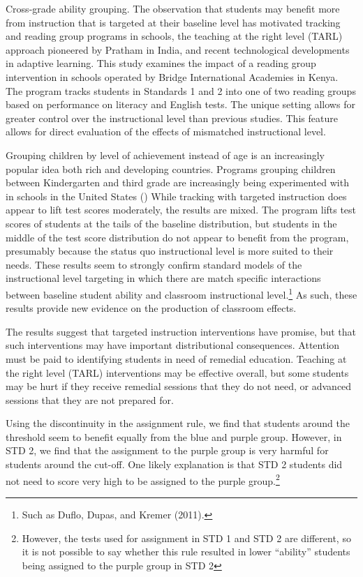 \documentclass[10pt]{article}
\begin{document}
Cross-grade ability grouping. The observation that students may benefit more from instruction that is targeted at their baseline level has motivated tracking and reading group programs in schools, the teaching at the right level (TARL) approach pioneered by Pratham in India, and recent technological developments in adaptive learning. This study examines the impact of a reading group intervention in schools operated by Bridge International Academies in Kenya. The program tracks students in Standards 1 and 2 into one of two reading groups based on performance on literacy and English tests. The unique setting allows for greater control over the instructional level than previous studies. This feature allows for direct evaluation of the effects of mismatched instructional level. 

Grouping children by level of achievement instead of age is an increasingly popular idea both rich and developing countries. Programs grouping children between Kindergarten and third grade are increasingly being experimented with in schools in the United States (\cite{edweek20191106})
While tracking with targeted instruction does appear to lift test scores moderately, the results are mixed. The program lifts test scores of students at the tails of the baseline distribution, but students in the middle of the test score distribution do not appear to benefit from the program, presumably because the status quo instructional level is more suited to their needs. These results seem to strongly confirm standard models of the instructional level targeting in which there are match specific interactions between baseline student ability and classroom instructional level.\footnote{Such as Duflo, Dupas, and Kremer (2011).} As such, these results provide new evidence on the production of classroom effects.

The results suggest that targeted instruction interventions have promise, but that such interventions may have important distributional consequences. Attention must be paid to identifying students in need of remedial education. Teaching at the right level (TARL) interventions may be effective overall, but some students may be hurt if they receive remedial sessions that they do not need, or advanced sessions that they are not prepared for.

Using the discontinuity in the assignment rule, we find that students around the threshold seem to benefit equally from the blue and purple group. However, in STD 2, we find that the assignment to the purple group is very harmful for students around the cut-off. One likely explanation is that STD 2 students did not need to score very high to be assigned to the purple group.\footnote{However, the tests used for assignment in STD 1 and STD 2 are different, so it is not possible to say whether this rule resulted in lower ``ability'' students being assigned to the purple group in STD 2}
\end{document}
